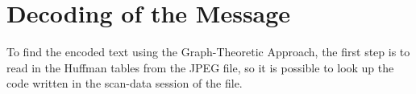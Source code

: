 \section{Decoding of the Message}
To find the encoded text using the Graph-Theoretic Approach, the first step is to read in the Huffman tables from the JPEG file, so it is possible to look up the code written in the scan-data session of the file. 

